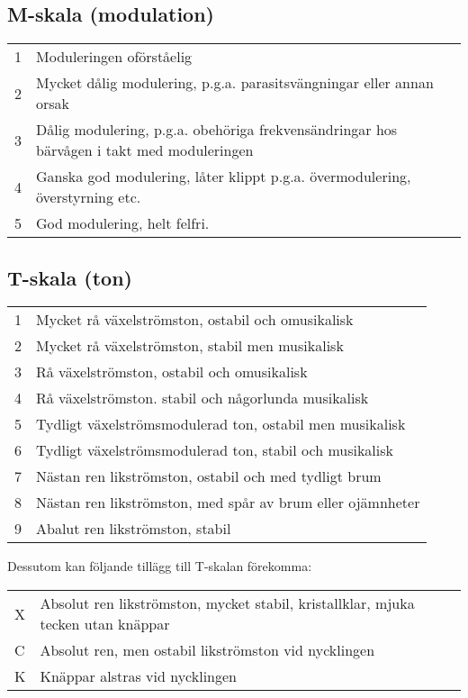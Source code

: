 \subsection{M-skala (modulation)}

\begin{tabular}{p{}p{}}
1 & Moduleringen oförståelig \\
2 & Mycket dålig modulering, p.g.a. parasitsvängningar eller annan orsak \\
3 & Dålig modulering, p.g.a. obehöriga frekvensändringar hos bärvågen i takt med moduleringen \\
4 & Ganska god modulering, låter klippt p.g.a. övermodulering, överstyrning etc. \\
5 & God modulering, helt felfri. \\
\end{tabular}

\subsection{T-skala (ton)}

\begin{tabular}{p{}p{}}
1 & Mycket rå växelströmston, ostabil och omusikalisk \\
2 & Mycket rå växelströmston, stabil men musikalisk \\
3 & Rå växelströmston, ostabil och omusikalisk \\
4 & Rå växelströmston. stabil och någorlunda musikalisk \\
5 & Tydligt växelströmsmodulerad ton, ostabil men musikalisk \\
6 & Tydligt växelströmsmodulerad ton, stabil och musikalisk \\
7 & Nästan ren likströmston, ostabil och med tydligt brum \\
8 & Nästan ren likströmston, med spår av brum eller ojämnheter \\
9 & Abalut ren likströmston, stabil \\
\end{tabular}

Dessutom kan följande tillägg till T-skalan förekomma:

\begin{tabular}{p{}p{}}
X & Absolut ren likströmston, mycket stabil, kristallklar, mjuka tecken utan knäppar \\
C & Absolut ren, men ostabil likströmston vid nycklingen \\
K & Knäppar alstras vid nycklingen \\
\end{tabular}


